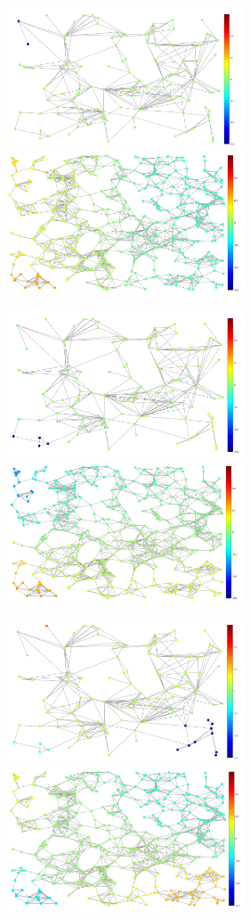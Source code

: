 \documentclass[a4paper]{article}
\begin{document}
\begin{figure}[H]
\centering
\includegraphics[width = 7cm]{plot_eigenvectors/reduced_eigenvec_1}
\includegraphics[width = 7cm]{plot_eigenvectors/original_eigenvec_1}

\includegraphics[width = 7cm]{plot_eigenvectors/reduced_eigenvec_2}
\includegraphics[width = 7cm]{plot_eigenvectors/original_eigenvec_2}

\includegraphics[width = 7cm]{plot_eigenvectors/reduced_eigenvec_3}
\includegraphics[width = 7cm]{plot_eigenvectors/original_eigenvec_3}


\end{figure}
\end{document}
